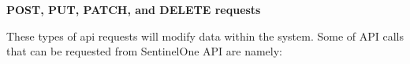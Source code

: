 
\textbf{POST, PUT, PATCH, and DELETE requests}

These types of \acrshort{api} requests will modify data within the system. Some of API calls that can be requested from SentinelOne API are
namely:

